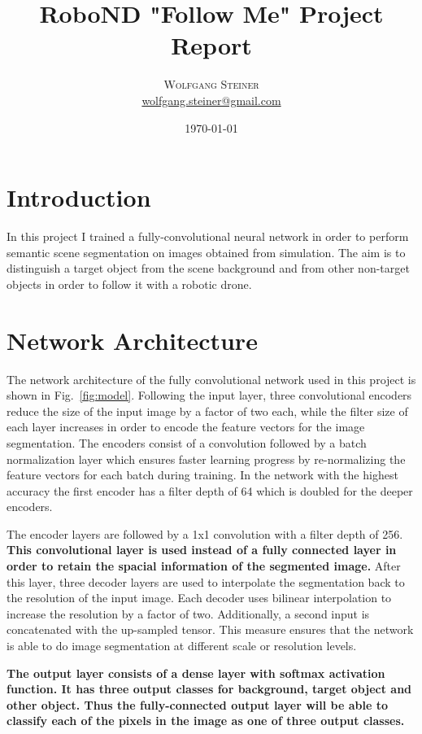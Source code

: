 \documentclass[twoside, twocolumn]{article}
\title{RoboND "Follow Me" Project Report   } %
\author{%
\textsc{Wolfgang Steiner} \\[0.5ex] %
\normalsize \href{mailto:wolfgang.steiner@gmail.com}{wolfgang.steiner@gmail.com} %
}
\date{\today} %
\newcommand{\figref}[1]{Fig.~\ref{fig:#1}}
\begin{document}
\maketitle

\section{Introduction}
In this project I trained a fully-convolutional neural network in order to
perform semantic scene segmentation on images obtained from simulation. The
aim is to distinguish a target object from the scene background and from other
non-target objects in order to follow it with a robotic drone.

\section{Network Architecture}
The network architecture of the fully convolutional network used in this project
is shown in \figref{model}. Following the input layer, three convolutional encoders reduce
the size of the input image by a factor of two each, while the filter size of each
layer increases in order to encode the feature vectors for the image segmentation.
The encoders consist of a convolution followed by a batch normalization layer which
ensures faster learning progress by re-normalizing the feature vectors for each
batch during training. In the network with the highest accuracy the first encoder
has a filter depth of 64 which is doubled for the deeper encoders.

The encoder layers are followed by a 1x1 convolution with a filter depth of
256. \textbf{This convolutional layer is used instead of a fully connected layer in order
to retain the spacial information of the segmented image.}
After this layer, three decoder layers are used to interpolate the segmentation
back to the resolution of the input image. Each decoder uses bilinear interpolation
to increase the resolution by a factor of two. Additionally, a second input is
concatenated with the up-sampled tensor. This measure ensures that the network is
able to do image segmentation at different scale or resolution levels.


\textbf{The output layer consists of a dense layer with softmax activation function. It has
three output classes for background, target object and other object. Thus the fully-connected
output layer will be able to classify each of the pixels in the image as one
of three output classes.}
\end{document}
